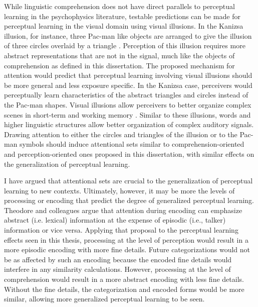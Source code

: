 While linguistic comprehension does not have direct parallels to perceptual learning in the psychophysics literature, testable predictions can be made for perceptual learning in the visual domain using visual illusions.
In the Kanizsa illusion, for instance, three Pac-man like objects are arranged to give the illusion of three circles overlaid by a triangle \citep{Kanizsa1976}.
Perception of this illusion requires more abstract representations that are not in the signal, much like the objects of comprehension as defined in this dissertation.
The proposed mechanism for attention would predict that perceptual learning involving visual illusions should be more general and less exposure specific.
In the Kanizsa case, perceivers would perceptually learn characteristics of the abstract triangles and circles instead of the Pac-man shapes.
Visual illusions allow perceivers to better organize complex scenes in short-term and working memory \citep{Vandenbroucke2012}.
Similar to these illusions, words and higher linguistic structures allow better organization of complex auditory signals.
Drawing attention to either the circles and triangles of the illusion or to the Pac-man symbols should induce attentional sets similar to comprehension-oriented and perception-oriented ones proposed in this dissertation, with similar effects on the generalization of perceptual learning.

I have argued that attentional sets are crucial to the generalization of perceptual learning to new contexts.
Ultimately, however, it may be more the levels of processing \citep{Cutler1987} or encoding \citep{Theodore2015} that predict the degree of generalized perceptual learning.
Theodore and colleagues argue that attention during encoding can emphasize abstract (i.e. lexical) information at the expense of episodic (i.e., talker) information or vice versa.
Applying that proposal to the perceptual learning effects seen in this thesis, processing at the level of perception would result in a more episodic encoding with more fine details.
Future categorizations would not be as affected by such an encoding because the encoded fine details would interfere in any similarity calculations.
However, processing at the level of comprehension would result in a more abstract encoding with less fine details.
Without the fine details, the categorization and encoded forms would be more similar, allowing more generalized perceptual learning to be seen.



